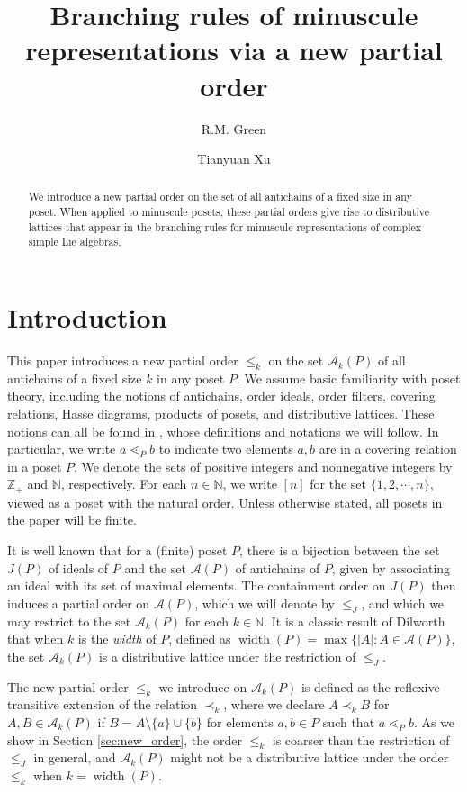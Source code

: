 \documentclass[11pt]{amsart}
\title{Branching rules of minuscule representations via a new partial order}
\author{R.M. Green}
\author{Tianyuan Xu}
\theoremstyle{plain}
\theoremstyle{definition}
\theoremstyle{remark}
\numberwithin{equation}{section}
\newcommand{\Z}{{\mathbb Z}}
\newcommand{\N}{\mathbb{N}}
\newcommand{\cala}{\mathcal{A}}
\newcommand{\akp}{\mathcal{A}_k(P)}
\newcommand{\abs}[1]{\lvert #1 \rvert}
\DeclareMathOperator{\width}{\mathrm{width}}
\begin{document}
\maketitle

\begin{abstract}
  We introduce a new partial order on the set of all antichains of a fixed size in
any poset.  When applied to minuscule posets, these partial orders give rise to
distributive lattices that appear in the branching rules for minuscule
representations of complex simple Lie algebras.
\end{abstract}


\section{Introduction}

This paper introduces a new partial order $\le_k$ on the set $\cala_k(P)$ of all
antichains of a fixed size $k$ in any poset $P$. We assume basic familiarity
with poset theory, including the notions of antichains, order ideals, order
filters, covering relations, Hasse diagrams, products of posets, and
distributive lattices.  These notions can all be found in \cite[\S 3]{EC1},
whose definitions and notations we will follow. In particular, we write $a
\lessdot_P b$  to indicate two elements $a,b$ are in a covering relation in a
poset $P$. We denote the sets of positive integers and nonnegative integers by
$\Z_+$ and $\N$, respectively. For each $n\in \N$, we write $[n]$ for the set
$\{1,2,\cdots, n\}$, viewed as a poset with the natural order. Unless otherwise
stated, all posets in the paper will be finite.

It is well known that for a (finite) poset $P$, there is a bijection between the
set $J(P)$ of ideals of $P$ and the set $\cala(P)$ of antichains of $P$, given
by associating an ideal with its set of maximal elements. The containment order
on $J(P)$ then induces a partial order on $\cala(P)$, which we will denote by
$\le_J$, and which we may restrict to the set $\cala_k(P)$ for each $k\in \N$.
It is a classic result of Dilworth \cite{dilworth60} that when $k$ is the
\emph{width} of $P$, defined as $\width(P)=\max\{\abs{A}:A\in \cala(P)\}$, the
set $\akp$ is a distributive lattice under the restriction of $\le_J$.

The new partial order $\le_k$ we introduce on $\akp$ is defined as the reflexive
transitive extension of the relation $\prec_k$, where we declare $A\prec_k B$
for $A,B\in \akp$ if $B=A\setminus\{a\}\cup\{b\}$ for elements $a,b\in P$ such
that $a\lessdot_P b$.  As we show in Section \ref{sec:new_order}, the order
$\le_k$ is coarser than the restriction of $\le_J$ in general, and $\akp$ might
not be a distributive lattice under the order $\le_k$ when $k=\width(P)$.
\end{document}
